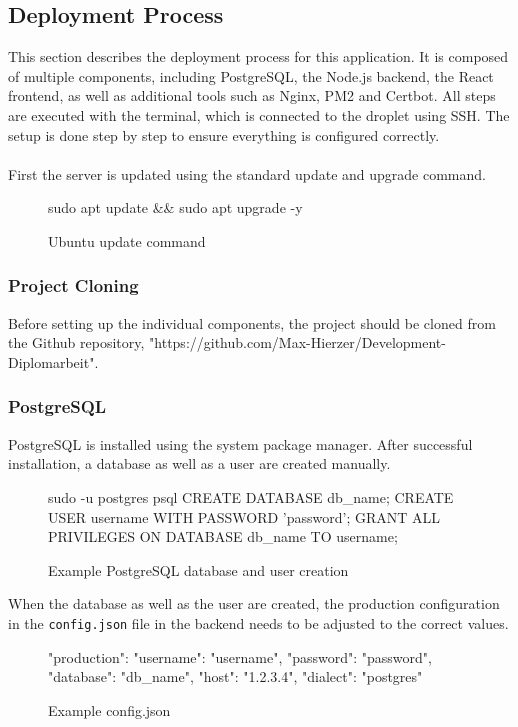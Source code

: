 \documentclass[a4paper,12pt]{report}
\begin{document}
\subsection{Deployment Process}
This section describes the deployment process for this application. It is composed of multiple components, including PostgreSQL, the Node.js backend, the React frontend, as well as additional tools such as Nginx, PM2 and Certbot. All steps are executed with the terminal, which is connected to the droplet using SSH. The setup is done step by step to ensure everything is configured correctly.\\\\
First the server is updated using the standard update and upgrade command.
\begin{figure}[H]
	\begin{terminal}
		sudo apt update && sudo apt upgrade -y
	\end{terminal}
	\caption{Ubuntu update command}
\end{figure}
\subsubsection{Project Cloning}
Before setting up the individual components, the project should be cloned from the Github repository, "https://github.com/Max-Hierzer/Development-Diplomarbeit".
\subsubsection{PostgreSQL}
PostgreSQL is installed using the system package manager. After successful installation, a database as well as a user are created manually.
\begin{figure}[H]
	\begin{terminal}
		sudo -u postgres psql
		CREATE DATABASE db_name;
		CREATE USER username WITH PASSWORD 'password';
		GRANT ALL PRIVILEGES ON DATABASE db_name TO username;
		\q
	\end{terminal}
	\caption{Example PostgreSQL database and user creation}
\end{figure}
\noindent
When the database as well as the user are created, the production configuration in the \texttt{config.json} file in the backend needs to be adjusted to the correct values.
\begin{figure}[H]
	\begin{terminal}
		"production": {
			"username": "username",
			"password": "password",
			"database": "db_name",
			"host": "1.2.3.4",
			"dialect": "postgres"
		}
	\end{terminal}
	\caption{Example config.json}
\end{figure}
\end{document}
